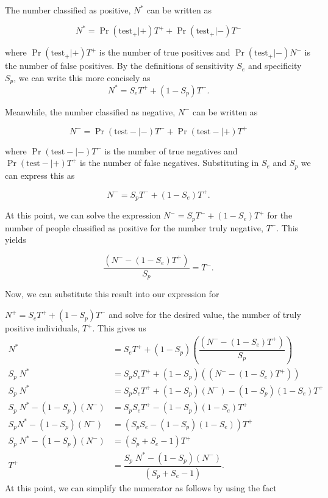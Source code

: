 \documentclass[12pt,twoside]{smiththesis}
\begin{document}
\noindent The number classified as positive, \(N^*\) can be written as

\[ N^* = \Pr(\text{test}_+ | +) T^+ + \Pr(\text{test}_+  | -) T^-\]

\noindent where \(\Pr(\text{test}_+ | +) T^+\) is the number of true positives and \(\Pr(\text{test}_+ | -) N^-\) is the number of false positives. By the definitions of sensitivity \(S_e\) and specificity \(S_p\), we can write this more concisely as
\[ N^* =S_e T^+ + (1-S_p) T^-.\]

\noindent Meanwhile, the number classified as negative, \(N^-\) can be written as

\[ N^- = \Pr(\text{test} - | -) T^- + \Pr(\text{test} - | +) T^+\]

\noindent where \(\Pr(\text{test} - | -) T^-\) is the number of true negatives and \(\Pr(\text{test}- | +) T^+\) is the number of false negatives. Substituting in \(S_e\) and \(S_p\) we can express this as

\[ N^- = S_p T^- + (1-S_e) T^+.\]

\noindent At this point, we can solve the expression \(N^- = S_p T^- + (1-S_e) T^+\) for the number of people classified as positive for the number truly negative, \(T^-\). This yields

\[\dfrac{( N^- - (1-S_e) T^+) }{S_p}=  T^- .\]

\noindent Now, we can substitute this result into our expression for

\noindent \(N^+ =S_e T^+ + (1-S_p) T^-\) and solve for the desired value, the number of truly positive individuals, \(T^+\). This gives us
\begin{align*}
 N^* &=S_e T^+ + (1-S_p)  \left( \dfrac{( N^- - (1-S_e) T^+) }{S_p} \right)
\\
 S_p \; N^* &=S_pS_e T^+ + (1-S_p)  \left( {( N^- - (1-S_e) T^+) } \right)
\\
 S_p \; N^* &=S_pS_e T^+ + (1-S_p)  ( N^-)  - (1-S_p)(1-S_e) T^+
\\
 S_p \; N^* -   (1-S_p)  ( N^-) &=S_pS_e T^+  - (1-S_p)(1-S_e) T^+
\\
 S_p N^* -   (1-S_p)  ( N^-) &= (S_pS_e  - (1-S_p)(1-S_e)) T^+
\\
 S_p \; N^* -   (1-S_p)  ( N^-) &= (S_p + S_e - 1) T^+
\\
 T^+ &= \dfrac{ S_p \; N^* -   (1-S_p)  ( N^-)}{(S_p + S_e - 1)} .
\end{align*}
At this point, we can simplify the numerator as follows by using the fact
\end{document}
